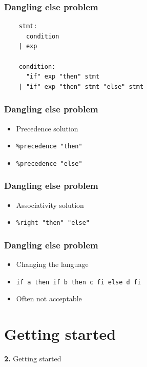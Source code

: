 \documentclass{beamer}
\begin{document}
\begin{frame}[fragile]
  \frametitle{Dangling else problem}
\begin{verbatim}
    stmt:
      condition
    | exp

    condition:
      "if" exp "then" stmt
    | "if" exp "then" stmt "else" stmt
\end{verbatim}
\end{frame}

\begin{frame}
  \frametitle{Dangling else problem}
    \begin{itemize}
      \item Precedence solution
      \item \texttt{\%precedence "then"}
      \item \texttt{\%precedence "else"}
    \end{itemize}
\end{frame}

\begin{frame}
  \frametitle{Dangling else problem}
    \begin{itemize}
      \item Associativity solution
      \item \texttt{\%right "then" "else"}
    \end{itemize}
\end{frame}

\begin{frame}
  \frametitle{Dangling else problem}
    \begin{itemize}
      \item Changing the language
      \item \texttt{if a then if b then c fi else d fi}
      \item Often not acceptable
    \end{itemize}
\end{frame}

\section{Getting started}

\begingroup
{}
\begin{frame}
    \begin{center}
        \vspace{1cm}
        {\Huge\color{black} \textbf{2.} { Getting started}}
    \end{center}
\end{frame}
\endgroup
\end{document}
